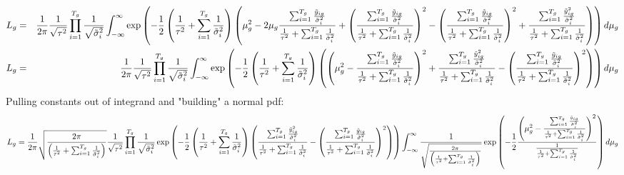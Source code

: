 \documentclass[12pt]{article}
\begin{document}
\begin{eqnarray*}
L_{g} &=&\frac{1}{2\pi }\frac{1}{\sqrt{\tau ^{2}}}\prod_{i=1}^{T_{g}}\frac{1%
}{\sqrt{\tilde{\sigma}_{i}^{2}}}\int_{-\infty }^{\infty }\exp \left( -\frac{1%
}{2}\left( \frac{1}{\tau ^{2}}+\sum_{i=1}^{T_{g}}\frac{1}{\tilde{\sigma}%
_{i}^{2}}\right) \left( \mu _{g}^{2}-2\mu _{g}\frac{\sum_{i=1}^{T_{g}}\frac{%
\tilde{y}_{ig}}{\tilde{\sigma}_{i}^{2}}}{\frac{1}{\tau ^{2}}%
+\sum_{i=1}^{T_{g}}\frac{1}{\tilde{\sigma}_{i}^{2}}}+\left( \frac{%
\sum_{i=1}^{T_{g}}\frac{\tilde{y}_{ig}}{\tilde{\sigma}_{i}^{2}}}{\frac{1}{%
\tau ^{2}}+\sum_{i=1}^{T_{g}}\frac{1}{\tilde{\sigma}_{i}^{2}}}\right)
^{2}-\left( \frac{\sum_{i=1}^{T_{g}}\frac{\tilde{y}_{ig}}{\tilde{\sigma}%
_{i}^{2}}}{\frac{1}{\tau ^{2}}+\sum_{i=1}^{T_{g}}\frac{1}{\tilde{\sigma}%
_{i}^{2}}}\right) ^{2}+\frac{\sum_{i=1}^{T_{g}}\frac{\tilde{y}_{ig}^{2}}{%
\tilde{\sigma}_{i}^{2}}}{\frac{1}{\tau ^{2}}+\sum_{i=1}^{T_{g}}\frac{1}{%
\tilde{\sigma}_{i}^{2}}}\right) \right) d\mu _{g} \\
L_{g} &=&\frac{1}{2\pi }\frac{1}{\sqrt{\tau ^{2}}}\prod_{i=1}^{T_{g}}\frac{1%
}{\sqrt{\tilde{\sigma}_{i}^{2}}}\int_{-\infty }^{\infty }\exp \left( -\frac{1%
}{2}\left( \frac{1}{\tau ^{2}}+\sum_{i=1}^{T_{g}}\frac{1}{\tilde{\sigma}%
_{i}^{2}}\right) \left( \left( \mu _{g}^{2}-\frac{\sum_{i=1}^{T_{g}}\frac{%
\tilde{y}_{ig}}{\tilde{\sigma}_{i}^{2}}}{\frac{1}{\tau ^{2}}%
+\sum_{i=1}^{T_{g}}\frac{1}{\tilde{\sigma}_{i}^{2}}}\right) ^{2}+\frac{%
\sum_{i=1}^{T_{g}}\frac{\tilde{y}_{ig}^{2}}{\tilde{\sigma}_{i}^{2}}}{\frac{1%
}{\tau ^{2}}+\sum_{i=1}^{T_{g}}\frac{1}{\tilde{\sigma}_{i}^{2}}}-\left( 
\frac{\sum_{i=1}^{T_{g}}\frac{\tilde{y}_{ig}}{\tilde{\sigma}_{i}^{2}}}{\frac{%
1}{\tau ^{2}}+\sum_{i=1}^{T_{g}}\frac{1}{\tilde{\sigma}_{i}^{2}}}\right)
^{2}\right) \right) d\mu _{g}
\end{eqnarray*}%
Pulling constants out of integrand and "building" a normal pdf:%
\[
L_{g}=\frac{1}{2\pi }\sqrt{\frac{2\pi }{\left( \frac{1}{\tau ^{2}}%
+\sum_{i=1}^{T_{g}}\frac{1}{\tilde{\sigma}_{i}^{2}}\right) }}\frac{1}{\sqrt{%
\tau ^{2}}}\prod_{i=1}^{T_{g}}\frac{1}{\sqrt{\tilde{\sigma}_{i}^{2}}}\exp
\left( -\frac{1}{2}\left( \frac{1}{\tau ^{2}}+\sum_{i=1}^{T_{g}}\frac{1}{%
\tilde{\sigma}_{i}^{2}}\right) \left( \frac{\sum_{i=1}^{T_{g}}\frac{\tilde{y}%
_{ig}^{2}}{\tilde{\sigma}_{i}^{2}}}{\frac{1}{\tau ^{2}}+\sum_{i=1}^{T_{g}}%
\frac{1}{\tilde{\sigma}_{i}^{2}}}-\left( \frac{\sum_{i=1}^{T_{g}}\frac{%
\tilde{y}_{ig}}{\tilde{\sigma}_{i}^{2}}}{\frac{1}{\tau ^{2}}%
+\sum_{i=1}^{T_{g}}\frac{1}{\tilde{\sigma}_{i}^{2}}}\right) ^{2}\right)
\right) \int_{-\infty }^{\infty }\frac{1}{\sqrt{\frac{2\pi }{\left( \frac{1}{%
\tau ^{2}}+\sum_{i=1}^{T_{g}}\frac{1}{\tilde{\sigma}_{i}^{2}}\right) }}}\exp
\left( -\frac{1}{2}\frac{\left( \mu _{g}^{2}-\frac{\sum_{i=1}^{T_{g}}\frac{%
\tilde{y}_{ig}}{\tilde{\sigma}_{i}^{2}}}{\frac{1}{\tau ^{2}}%
+\sum_{i=1}^{T_{g}}\frac{1}{\tilde{\sigma}_{i}^{2}}}\right) ^{2}}{\frac{1}{%
\frac{1}{\tau ^{2}}+\sum_{i=1}^{T_{g}}\frac{1}{\tilde{\sigma}_{i}^{2}}}}%
\right) d\mu _{g} 
\]%
\end{document}
